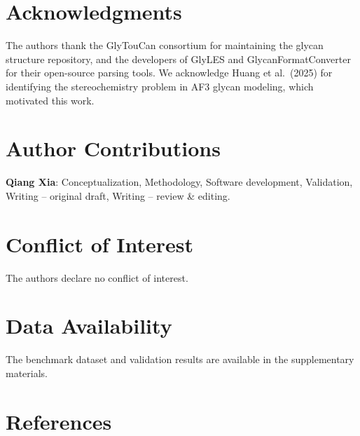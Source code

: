\documentclass[11pt,a4paper]{article}
\begin{document}
\section*{Acknowledgments}

The authors thank the GlyTouCan consortium for maintaining the glycan structure repository, and the developers of GlyLES and GlycanFormatConverter for their open-source parsing tools. We acknowledge Huang et al.\ (2025) for identifying the stereochemistry problem in AF3 glycan modeling, which motivated this work.

\section*{Author Contributions}

\noindent\textbf{Qiang Xia}: Conceptualization, Methodology, Software development, Validation, Writing -- original draft, Writing -- review \& editing.

\section*{Conflict of Interest}

The authors declare no conflict of interest.

\section*{Data Availability}

The benchmark dataset and validation results are available in the supplementary materials.

\section*{References}
\end{document}
